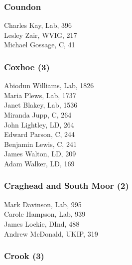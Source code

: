 \documentclass[a4paper,openany,10pt]{book}
\begin{document}
\subsubsection*{Coundon}



Charles Kay, Lab, 396\\
Lesley Zair, WVIG, 217\\
Michael Gossage, C, 41\\


\subsubsection*{Coxhoe (3)}



Abiodun Williams, Lab, 1826\\
Maria Plews, Lab, 1737\\
Janet Blakey, Lab, 1536\\
Miranda Jupp, C, 264\\
John Lightley, LD, 264\\
Edward Parson, C, 244\\
Benjamin Lewis, C, 241\\
James Walton, LD, 209\\
Adam Walker, LD, 169\\


\subsubsection*{Craghead and South Moor (2)}



Mark Davinson, Lab, 995\\
Carole Hampson, Lab, 939\\
James Lockie, DInd, 488\\
Andrew McDonald, UKIP, 319\\


\subsubsection*{Crook (3)}

\end{document}
